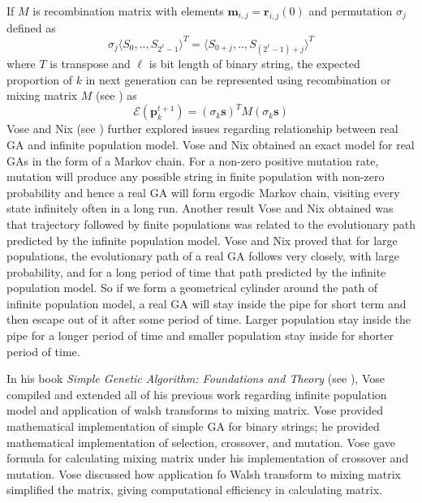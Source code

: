 If $M$ is recombination matrix with elements $\bm{m}_{i,j} = \bm{r}_{i,j}(0)$ and permutation $\sigma_j$ defined as 
\[
\sigma_j{\langle S_0,..,S_{2^\ell - 1} \rangle}^{T} = {\langle S_{0+j},..,S_{(2^\ell - 1)+j} \rangle}^{T}
\]
where $T$ is transpose and $\ell$ is bit length of binary string, the expected proportion 
of $k$ in next generation can be represented using recombination or mixing matrix $M$ (see \cite{VoseLiepins1991}) as
\[
\mathcal{E}(\bm{p}_k^{t+1}) = (\sigma_k \bm{s})^T M (\sigma_k \bm{s})
\]
Vose and Nix (see \cite{Nix1992}) further explored issues regarding relationship between real GA and infinite population model. 
Vose and Nix obtained an exact model for real GAs in the form of a Markov chain. For a non-zero positive mutation rate, mutation 
will produce any possible string in finite population with non-zero probability and 
hence a real GA will form ergodic Markov chain, visiting every state infinitely often in a long run.
Another result Vose and Nix obtained was that trajectory followed by finite populations was related to 
the evolutionary path predicted by the infinite population model. 
Vose and Nix proved that for large populations, the evolutionary path of a real GA follows very closely, 
with large probability, and for a long period of time that path predicted by 
the infinite population model. So if we form 
a geometrical cylinder 
around the path of infinite population model, a real GA will stay inside the pipe for short term and 
then escape out of it after some period of time. 
Larger population stay inside the pipe for a longer period of time and smaller population stay inside for shorter period of time. 


In his book \textit{Simple Genetic Algorithm: Foundations and Theory} (see \cite{Vose1999}), Vose compiled and 
extended all of his previous work regarding infinite population model and application of walsh transforms to mixing matrix. 
Vose provided mathematical implementation of simple GA for binary strings; he provided mathematical implementation of 
selection, crossover, and mutation. Vose gave formula for calculating mixing matrix under his implementation of crossover 
and mutation. Vose discussed how application fo Walsh transform to mixing matrix simplified the matrix, giving 
computational efficiency in calculating matrix.

